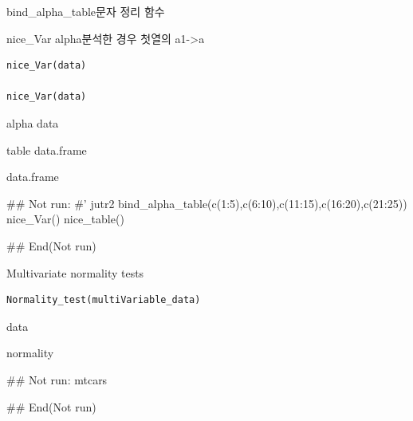 \documentclass[a4paper]{book}
\begin{document}
%
\begin{Description}
bind\_alpha\_table문자 정리 함수

nice\_Var alpha분석한 경우 첫열의 a1->a
\end{Description}
%
\begin{Usage}
\begin{verbatim}
nice_Var(data)

nice_Var(data)
\end{verbatim}
\end{Usage}
%
\begin{Arguments}
\begin{ldescription}
\item[\code{data}] alpha data
\end{ldescription}
\end{Arguments}
%
\begin{Value}
table data.frame

data.frame
\end{Value}
%
\begin{Examples}
\begin{ExampleCode}

\#\# Not run: 
#'
jutr2 %
  bind_alpha_table(c(1:5),c(6:10),c(11:15),c(16:20),c(21:25))%
  nice_Var()%
  nice_table()

## End(Not run)
\end{ExampleCode}
\end{Examples}

%
\begin{Description}
Multivariate normality tests
\end{Description}
%
\begin{Usage}
\begin{verbatim}
Normality_test(multiVariable_data)
\end{verbatim}
\end{Usage}
%
\begin{Arguments}
\begin{ldescription}
\item[\code{multiVariable\_data}] data
\end{ldescription}
\end{Arguments}
%
\begin{Value}
normality
\end{Value}
%
\begin{Examples}
\begin{ExampleCode}

\#\# Not run: 
mtcars%

## End(Not run)

\end{ExampleCode}
\end{Examples}
\end{document}
